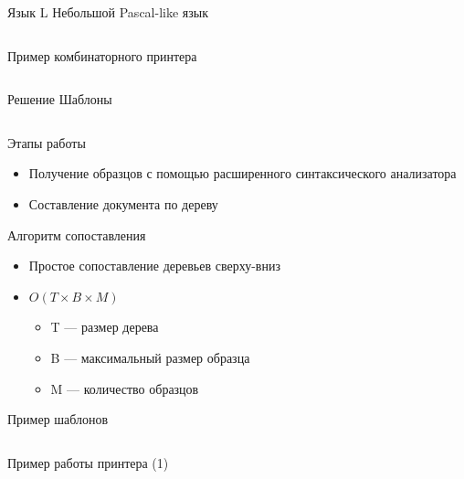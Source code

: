 \documentclass{beamer}
\begin{document}
\begin{frame}{Язык L}
	Небольшой Pascal-like язык
	\vspace{1cm}
	\begin{block}{}
		\inputminted{c}{codes/pow.l}
	\end{block}
\end{frame}

\begin{frame}{Пример комбинаторного принтера}
	\inputminted{haskell}{codes/lHughesPrinter.hs}
\end{frame}

\begin{frame}{Решение}
	Шаблоны
	\begin{block}{}
		\inputminted{pascal}{codes/l_write.t}
	\end{block}
\end{frame}

\begin{frame}{Этапы работы}
	\begin{itemize}
		\item Получение образцов с помощью расширенного синтаксического анализатора
		\item Составление документа по дереву
	\end{itemize}
\end{frame}

\begin{frame}{Алгоритм сопоставления}
	\begin{itemize}
		\item Простое сопоставление деревьев сверху-вниз
		\item $O(T \times B \times M)$
		\begin{itemize}
			\item T --- размер дерева
			\item B --- максимальный размер образца
			\item M --- количество образцов
		\end{itemize}
	\end{itemize}
\end{frame}

\begin{frame}{Пример шаблонов}
	\begin{block}{}
		\inputminted{c}{codes/l_while.t}
	\end{block}
\end{frame}

\begin{frame}{Пример работы принтера (1)}
	\begin{block}{}
		\inputminted{c}{codes/firstTemplatePow.l}
	\end{block}
\end{frame}
\end{document}
